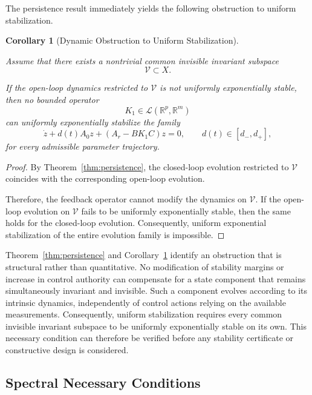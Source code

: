\documentclass[pdflatex,sn-mathphys-num]{sn-jnl}
\theoremstyle{thmstyleone}%
\theoremstyle{thmstyletwo}%
\theoremstyle{thmstylethree}%
\newtheorem{corollary}{Corollary}
\begin{document}
The persistence result immediately yields the following obstruction to uniform stabilization.

\begin{corollary}[Dynamic Obstruction to Uniform Stabilization]
\label{cor:dynamic-obstruction}

Assume that there exists a nontrivial common invisible invariant subspace
\[
\mathcal V\subset X.
\]

If the open-loop dynamics restricted to \(\mathcal V\) is not uniformly exponentially stable, then no bounded operator
\[
K_{1}\in\mathcal L(\mathbb R^{p},\mathbb R^{m})
\]
can uniformly exponentially stabilize the family
\[
\dot z
+
d(t)A_{0}z
+
(A_{r}-BK_{1}C)z
=
0,
\qquad
d(t)\in[d_-,d_+],
\]
for every admissible parameter trajectory.

\end{corollary}

\begin{proof}

By Theorem~\ref{thm:persistence}, the closed-loop evolution restricted to \(\mathcal V\) coincides with the corresponding open-loop evolution.

Therefore, the feedback operator cannot modify the dynamics on \(\mathcal V\).
If the open-loop evolution on \(\mathcal V\) fails to be uniformly exponentially stable, then the same holds for the closed-loop evolution. Consequently, uniform exponential stabilization of the entire evolution family is impossible.

\end{proof}

Theorem~\ref{thm:persistence} and Corollary~\ref{cor:dynamic-obstruction} identify an obstruction that is structural rather than quantitative. No modification of stability margins or increase in control authority can compensate for a state component that remains simultaneously invariant and invisible. Such a component evolves according to its intrinsic dynamics, independently of control actions relying on the available measurements. Consequently, uniform stabilization requires every common invisible invariant subspace to be uniformly exponentially stable on its own. This necessary condition can therefore be verified before any stability certificate or constructive design is considered.

\subsection{Spectral Necessary Conditions}
\label{subsec:spectral-obstructions}
\end{document}
